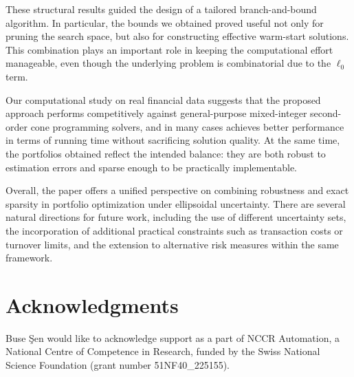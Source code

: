 \documentclass[11pt]{article}
\theoremstyle{plain}
\theoremstyle{definition}
\theoremstyle{plain}
\begin{document}
These structural results guided the design of a tailored branch-and-bound algorithm. In particular, the bounds we obtained proved useful not only for pruning the search space, but also for constructing effective warm-start solutions. This combination plays an important role in keeping the computational effort manageable, even though the underlying problem is combinatorial due to the $\ell_0$ term.

Our computational study on real financial data suggests that the proposed approach performs competitively against general-purpose mixed-integer second-order cone programming solvers, and in many cases achieves better performance in terms of running time without sacrificing solution quality. At the same time, the portfolios obtained reflect the intended balance: they are both robust to estimation errors and sparse enough to be practically implementable.

Overall, the paper offers a unified perspective on combining robustness and exact sparsity in portfolio optimization under ellipsoidal uncertainty. There are several natural directions for future work, including the use of different uncertainty sets, the incorporation of additional practical constraints such as transaction costs or turnover limits, and the extension to alternative risk measures within the same framework.


\section*{Acknowledgments}
Buse \c{S}en would like to acknowledge support as a part of NCCR Automation, a National Centre of Competence in Research, funded by the Swiss National Science Foundation (grant number 51NF40\_225155).

 

\end{document}
